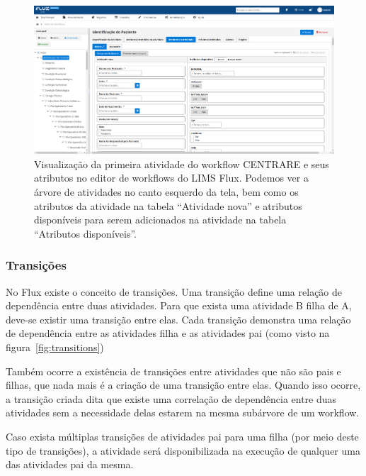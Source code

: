 \begin{figure}
    \centering
    \includegraphics[width=1\textwidth]{imgs/Flux/Workflows/Editor/editor_centrare.png}
    \caption{Visualização da primeira atividade do workflow CENTRARE e seus atributos no editor de workflows do LIMS Flux. Podemos ver a árvore de atividades no canto esquerdo da tela, bem como os atributos da atividade na tabela ``Atividade nova'' e atributos disponíveis para serem adicionados na atividade na tabela ``Atributos disponíveis''.}
    \label{fig:editor_centrare}
\end{figure}

\subsubsection{Transições} \label{sec:transitions}

No Flux existe o conceito de transições. Uma transição define uma relação de dependência entre duas atividades. Para que exista uma atividade B filha de A, deve-se existir uma transição entre elas. Cada transição demonstra uma relação de dependência entre as atividades filha e as atividades pai (como visto na figura~\ref{fig:transitions})

Também ocorre a existência de transições entre atividades que não são pais e filhas, que nada mais é a criação de uma transição entre elas. Quando isso ocorre, a transição criada dita que existe uma correlação de dependência entre duas atividades sem a necessidade delas estarem na mesma subárvore de um workflow.

Caso exista múltiplas transições de atividades pai para uma filha (por meio deste tipo de transições), a atividade será disponibilizada na execução de qualquer uma das atividades pai da mesma.


